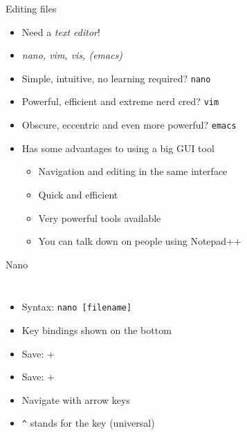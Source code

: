    \begin{frame}[t,fragile]{Editing files}
        \begin{itemize}
            \item Need a \emph{text editor}!
            \item \emph{nano, vim, vis, (emacs)}
            \item Simple, intuitive, no learning required? \textrightarrow\:\texttt{nano}
            \item Powerful, efficient and extreme nerd cred? \textrightarrow\:\texttt{vim}
            \item Obscure, eccentric and even more powerful? \textrightarrow\:\texttt{emacs}
            \item Has some advantages to using a big GUI tool
                \begin{itemize}
                    \item Navigation and editing in the same interface
                    \item Quick and efficient
                    \item Very powerful tools available
                    \item You can talk down on people using Notepad++
                \end{itemize}
        \end{itemize}
    \end{frame}

    \begin{frame}[t,fragile]{Nano}
        \begin{columns}[T]
            \begin{itemize}
                \item Syntax: \texttt{nano [filename]}
                \item Key bindings shown on the bottom
                \item Save: \keys{\ctrl} + 
                \item Save: \keys{\ctrl} + 
                \item Navigate with arrow keys \keys{\arrowkeyleft}
                    \keys{\arrowkeydown} \keys{\arrowkeyup}
                    \keys{\arrowkeyright}
                \item \texttt{\textasciicircum} stands for the \keys{\ctrl} key (universal)
            \end{itemize}
        \end{columns}
    \end{frame}

